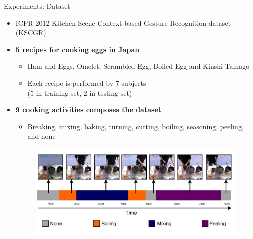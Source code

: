 \documentclass[usenames,dvipsnames]{beamer}
\begin{document}
\begin{frame}{Experiments: Dataset}
   	\begin{itemize}
   		\item ICPR 2012 Kitchen Scene Context based Gesture Recognition dataset (KSCGR)%
	    \item \textbf{5 recipes for cooking eggs in Japan}
   		\begin{itemize}
				\item Ham and Eggs, Omelet, Scrambled-Egg, Boiled-Egg and Kinshi-Tamago
				\item Each recipe is performed by 7 subjects \\(5 in training set, 2 in testing set)
	    \end{itemize}
	    \item \textbf{9 cooking activities composes the dataset}
   		\begin{itemize}
				\item Breaking, mixing, baking, turning, cutting, boiling, seasoning, peeling, and none
	    \end{itemize}
		\begin{figure}[here]
			\centering
			\includegraphics[width=0.7\linewidth]{fig/egg-dataset.pdf}
		\end{figure}
	\end{itemize}
\end{frame}
\end{document}
